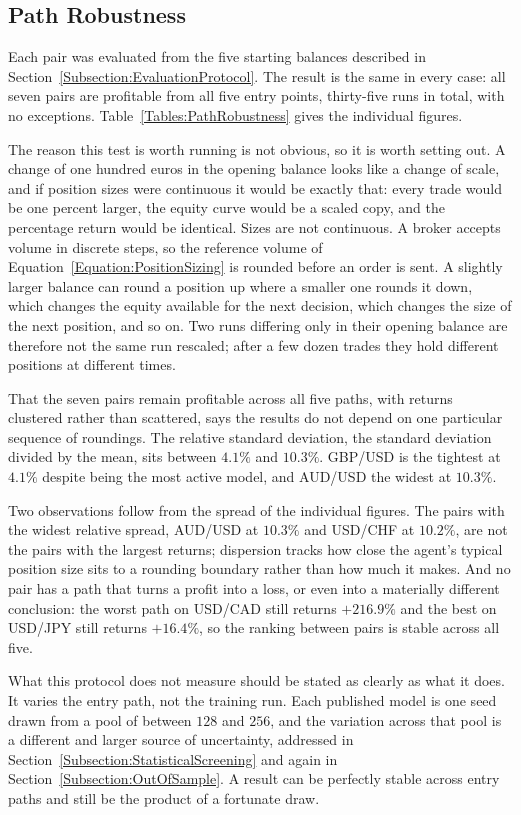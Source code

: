 \subsection{Path Robustness}
\label{Subsection:PathRobustness}

Each pair was evaluated from the five starting balances described in Section~\ref{Subsection:EvaluationProtocol}. The result is the same in every case: all seven pairs are profitable from all five entry points, thirty-five runs in total, with no exceptions. Table~\ref{Tables:PathRobustness} gives the individual figures.



The reason this test is worth running is not obvious, so it is worth setting out. A change of one hundred euros in the opening balance looks like a change of scale, and if position sizes were continuous it would be exactly that: every trade would be one percent larger, the equity curve would be a scaled copy, and the percentage return would be identical. Sizes are not continuous. A broker accepts volume in discrete steps, so the reference volume of Equation~\ref{Equation:PositionSizing} is rounded before an order is sent. A slightly larger balance can round a position up where a smaller one rounds it down, which changes the equity available for the next decision, which changes the size of the next position, and so on. Two runs differing only in their opening balance are therefore not the same run rescaled; after a few dozen trades they hold different positions at different times.

That the seven pairs remain profitable across all five paths, with returns clustered rather than scattered, says the results do not depend on one particular sequence of roundings. The relative standard deviation, the standard deviation divided by the mean, sits between $4.1\%$ and $10.3\%$. GBP/USD is the tightest at $4.1\%$ despite being the most active model, and AUD/USD the widest at $10.3\%$.

Two observations follow from the spread of the individual figures. The pairs with the widest relative spread, AUD/USD at $10.3\%$ and USD/CHF at $10.2\%$, are not the pairs with the largest returns; dispersion tracks how close the agent's typical position size sits to a rounding boundary rather than how much it makes. And no pair has a path that turns a profit into a loss, or even into a materially different conclusion: the worst path on USD/CAD still returns $+216.9\%$ and the best on USD/JPY still returns $+16.4\%$, so the ranking between pairs is stable across all five.

What this protocol does not measure should be stated as clearly as what it does. It varies the entry path, not the training run. Each published model is one seed drawn from a pool of between $128$ and $256$, and the variation across that pool is a different and larger source of uncertainty, addressed in Section~\ref{Subsection:StatisticalScreening} and again in Section~\ref{Subsection:OutOfSample}. A result can be perfectly stable across entry paths and still be the product of a fortunate draw.